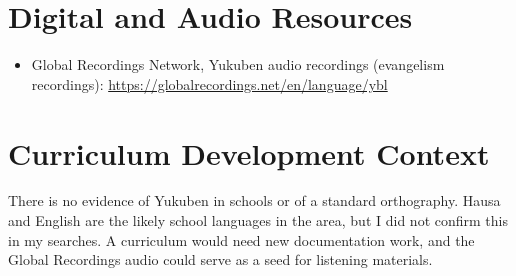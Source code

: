 \documentclass[12pt]{article}
\begin{document}
\section{Digital and Audio Resources}
\begin{itemize}
\item Global Recordings Network, Yukuben audio recordings (evangelism recordings): \url{https://globalrecordings.net/en/language/ybl}
\end{itemize}

\section{Curriculum Development Context}
There is no evidence of Yukuben in schools or of a standard orthography. Hausa and English are the likely school languages in the area, but I did not confirm this in my searches. A curriculum would need new documentation work, and the Global Recordings audio could serve as a seed for listening materials.
\end{document}

